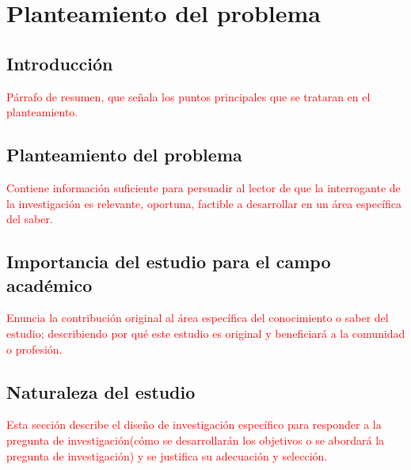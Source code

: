 \chapter{Planteamiento del problema}\label{cap:01}
\thispagestyle{empty}


\section{Introducción}
\textcolor{red}{Párrafo de resumen, que señala los puntos principales que se trataran en el planteamiento.}

\section{Planteamiento del problema}

\textcolor{red}{Contiene información suficiente para persuadir al lector de que la interrogante de la investigación es relevante, oportuna, factible a desarrollar en un área específica del saber.}


\section{Importancia del estudio para el campo académico}

\textcolor{red}{Enuncia la contribución original al área específica del conocimiento o saber del estudio; describiendo por qué este estudio es original y beneficiará a la comunidad o profesión.}


\section{Naturaleza del estudio}

\textcolor{red}{Esta sección describe el diseño de investigación específico para responder a la pregunta de 
investigación(cómo se desarrollarán los objetivos o se abordará la pregunta de investigación) y se justifica su 
adecuación y selección.}


